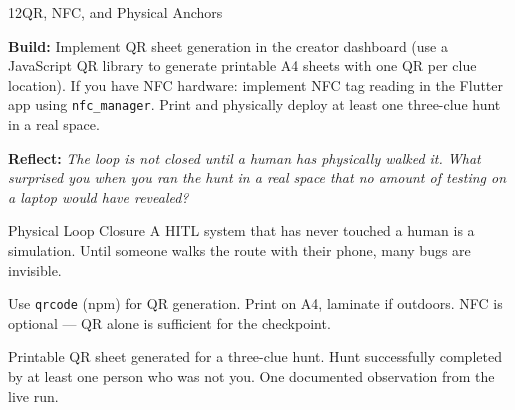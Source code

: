 \documentclass[
  11pt,
  oneside,
  DIV=12,
]{scrartcl}
\newcommand{\build}[1]{\textbf{\color{SpringMoss}Build:} #1}
\newcommand{\reflect}[1]{\textbf{\color{ConceptBlue}Reflect:} \textit{#1}}
\begin{document}
\begin{milestone}{12}{QR, NFC, and Physical Anchors}

\build{Implement QR sheet generation in the creator dashboard (use a
JavaScript QR library to generate printable A4 sheets with one QR per
clue location). If you have NFC hardware: implement NFC tag reading in
the Flutter app using \texttt{nfc\_manager}. Print and physically deploy
at least one three-clue hunt in a real space.}

\medskip
\reflect{The loop is not closed until a human has physically walked it.
What surprised you when you ran the hunt in a real space that no amount
of testing on a laptop would have revealed?}

\begin{hitlconcept}{Physical Loop Closure}
  A HITL system that has never touched a human is a simulation. Until
  someone walks the route with their phone, many bugs are invisible.
\end{hitlconcept}

\begin{hintbox}
  Use \texttt{qrcode} (npm) for QR generation. Print on A4, laminate if
  outdoors. NFC is optional — QR alone is sufficient for the checkpoint.
\end{hintbox}

\begin{checkpoint}
  Printable QR sheet generated for a three-clue hunt.
  Hunt successfully completed by at least one person who was not you.
  One documented observation from the live run.
\end{checkpoint}

\end{milestone}
\end{document}
